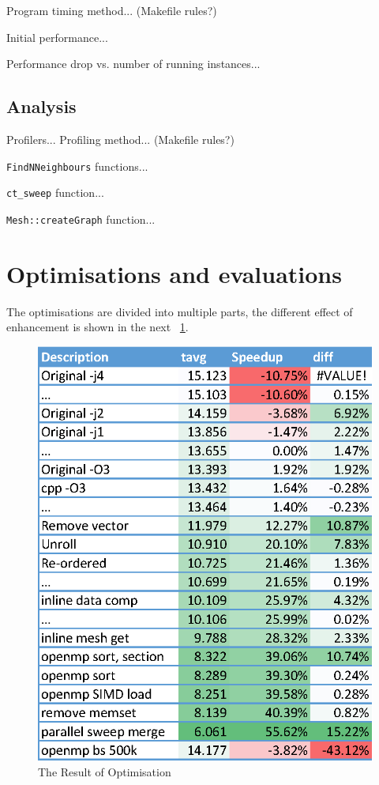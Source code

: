 \documentclass[conference]{IEEEtran}
\newcommand{\fref}[1]{\figurename~\ref{#1}}
\begin{document}
Program timing method... (Makefile rules?)

Initial performance...

Performance drop vs. number of running instances...

\subsection{Analysis}

Profilers... Profiling method... (Makefile rules?)

\texttt{FindNNeighbours} functions...

\texttt{ct\_sweep} function...

\texttt{Mesh::createGraph} function...

\section{Optimisations and evaluations}
The optimisations are divided into multiple parts, the different effect of enhancement is shown in the next \fref{fig:log}. 
\begin{figure}[!ht]
	\centering
	\includegraphics[width=\columnwidth]{data_log}
	\caption{The Result of Optimisation}
	\label{fig:log}
\end{figure}
\end{document}
